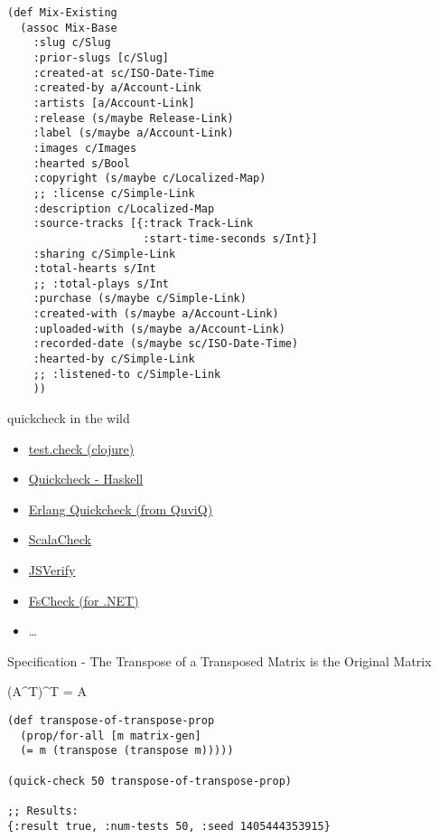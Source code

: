 \documentclass[presentation, bigger]{beamer}
\begin{document}
\begin{frame}[fragile,shrink,label=sec-]{}
 \begin{verbatim}
(def Mix-Existing
  (assoc Mix-Base
    :slug c/Slug
    :prior-slugs [c/Slug]
    :created-at sc/ISO-Date-Time
    :created-by a/Account-Link
    :artists [a/Account-Link]
    :release (s/maybe Release-Link)
    :label (s/maybe a/Account-Link)
    :images c/Images
    :hearted s/Bool
    :copyright (s/maybe c/Localized-Map)
    ;; :license c/Simple-Link
    :description c/Localized-Map
    :source-tracks [{:track Track-Link
                     :start-time-seconds s/Int}]
    :sharing c/Simple-Link
    :total-hearts s/Int
    ;; :total-plays s/Int
    :purchase (s/maybe c/Simple-Link)
    :created-with (s/maybe a/Account-Link)
    :uploaded-with (s/maybe a/Account-Link)
    :recorded-date (s/maybe sc/ISO-Date-Time)
    :hearted-by c/Simple-Link
    ;; :listened-to c/Simple-Link
    ))
\end{verbatim}
\end{frame}
\begin{frame}[label=sec-]{quickcheck in the wild}
\begin{itemize}
\item \href{https://github.com/clojure/test.check}{test.check (clojure)}
\item \href{https://hackage.haskell.org/package/QuickCheck}{Quickcheck - Haskell}
\item \href{http://www.quviq.com/products/erlang-quickcheck/}{Erlang Quickcheck (from QuviQ)}
\item \href{http://www.scalacheck.org/}{ScalaCheck}
\item \href{http://jsverify.github.io/}{JSVerify}
\item \href{https://github.com/fsharp/FsCheck}{FsCheck (for .NET)}
\item \ldots{}
\end{itemize}
\end{frame}
\begin{frame}[fragile,label=sec-]{Specification - The Transpose of a Transposed Matrix is the Original Matrix}
 \begin{block}{(A\^{}T)\^{}T = A}
\begin{verbatim}
(def transpose-of-transpose-prop
  (prop/for-all [m matrix-gen]
  (= m (transpose (transpose m)))))

(quick-check 50 transpose-of-transpose-prop)

;; Results:
{:result true, :num-tests 50, :seed 1405444353915}
\end{verbatim}
\end{block}
\end{frame}
\end{document}
